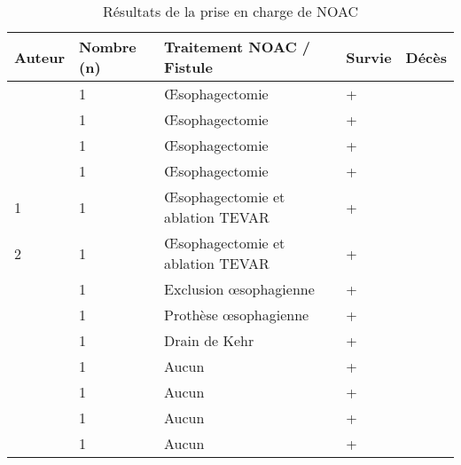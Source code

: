 \begin{table}\citeauthor{}
\centering
\begin{tabular}{lllll}
\hline
Auteur                                      & Nombre (n) & Traitement NOAC / Fistule        & Survie & Décès \\ \hline
\citeauthor{abou-al-shaar_free_2016}        & 1          & Œsophagectomie                   & +      &       \\
\citeauthor{iuamoto_necrose_2015}           & 1          & Œsophagectomie                   & +      &       \\
\citeauthor*{joubert_successful_2016}       & 1          & Œsophagectomie                   & +      &       \\
\citeauthor{tobisch_successful_2014}        & 1          & Œsophagectomie                   & +      &       \\
\citeauthor{yaguchi_seven_2017} 1           & 1          & Œsophagectomie et ablation TEVAR & +      &       \\
\citeauthor{yaguchi_seven_2017} 2           & 1          & Œsophagectomie et ablation TEVAR & +      &       \\
\citeauthor{park_ischemic_2004}             & 1          & Exclusion œsophagienne           & +      &       \\
\citeauthor{rascanu_osophagusnekrose_2009}  & 1          & Prothèse œsophagienne            & +      &       \\
\citeauthor{porcu_esophageal_2005}          & 1          & Drain de Kehr                    & +      &       \\
\citeauthor{kaneda_delayed_2005}            & 1          & Aucun                            & +      &       \\
\citeauthor{minatoya_transmural_2000}       & 1          & Aucun                            & +      &       \\
\citeauthor{koizumi_esophageal_2017}        & 1          & Aucun                            & +      &       \\
\citeauthor{de_praetere_esophageal_2010}    & 1          & Aucun                            & +      &       \\ \hline
\end{tabular}
\caption{Résultats de la prise en charge de NOAC}
\label{tab:resultats}
\end{table}